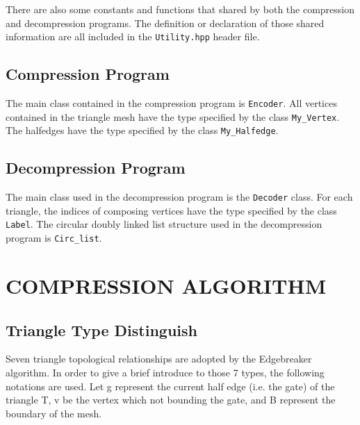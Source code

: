 \documentclass[onecolumn, 12pt]{article}
\begin{document}
\vspace{0.7em}
{\setlength\parindent{0pt}
There are also some constants and functions that shared by both the compression and decompression programs. The definition or declaration of those shared information are all included in the \lstinline!Utility.hpp! header file. \vspace{0.5em}




\subsection{Compression Program}
The main class contained in the compression program is \lstinline!Encoder!. All vertices contained in the triangle mesh have the type specified by the class \lstinline!My_Vertex!. The halfedges have the type specified by the class \lstinline!My_Halfedge!.\vspace{0.5em}



\subsection{Decompression Program}
The main class used in the decompression program is the \lstinline!Decoder! class. For each triangle, the indices of composing vertices have the type specified by the class \lstinline!Label!. The circular doubly linked list structure used in the decompression program is \lstinline!Circ_list!.\vspace{0.5em}





\section{COMPRESSION ALGORITHM}
\subsection{Triangle Type Distinguish} \label{sec:triType}
Seven triangle topological relationships are adopted by the Edgebreaker algorithm. In order to give a brief introduce to those 7 types, the following notations are used. Let g represent the current half edge (i.e. the gate) of the triangle T, v be the vertex which not bounding the gate, and B represent the boundary of the mesh.

}
\end{document}
